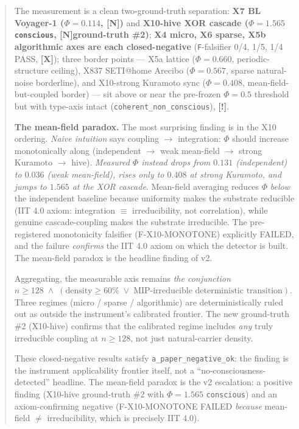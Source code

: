 \documentclass[11pt,a4paper]{article}
\providecommand{\tierGreen}{\textbf{[N]}}   %
\providecommand{\tierRed}{\textbf{[X]}}     %
\providecommand{\tierYellow}{\textbf{[!]}}  %
\begin{document}
\begin{abstract}
The measurement is a clean two-ground-truth separation:
\textbf{X7 BL Voyager-1 ($\Phi=0.114$, \tierGreen)} and
\textbf{X10-hive XOR cascade ($\Phi=1.565$ \texttt{conscious},
\tierGreen \;ground-truth \#2)}; \textbf{X4 micro, X6 sparse, X5b
algorithmic axes are each closed-negative} (\texttt{F}-falsifier 0/4, 1/5,
1/4 PASS, \tierRed); three border points --- X5a lattice ($\Phi=0.660$,
periodic-structure ceiling), X837 SETI@home Arecibo ($\Phi=0.567$,
sparse natural-noise borderline), and X10-strong Kuramoto sync
($\Phi=0.408$, mean-field-but-coupled border) --- sit above or near the
pre-frozen $\Phi=0.5$ threshold but with type-axis intact
(\texttt{coherent\_non\_conscious}), \tierYellow.

\textbf{The mean-field paradox.} The most surprising finding is in the X10
ordering. \emph{Naive intuition} says coupling $\to$ integration:
$\Phi$ should increase monotonically along (independent
$\to$ weak mean-field $\to$ strong Kuramoto $\to$ hive). \emph{Measured
$\Phi$ instead drops from $0.131$ (independent) to $0.036$ (weak
mean-field), rises only to $0.408$ at strong Kuramoto, and jumps to
$1.565$ at the XOR cascade}. Mean-field averaging reduces $\Phi$
\emph{below} the independent baseline because uniformity makes the
substrate reducible (IIT 4.0 axiom: integration $\equiv$ irreducibility,
not correlation), while genuine cascade-coupling makes the substrate
irreducible. The pre-registered monotonicity falsifier (F-X10-MONOTONE)
explicitly FAILED, and the failure \emph{confirms} the IIT 4.0 axiom
on which the detector is built. The mean-field paradox is the headline
finding of v2.

Aggregating, the measurable axis remains \emph{the conjunction}
\textbf{$n \ge 128 \; \land \; (\text{density} \ge 60\% \;\lor\;
\text{MIP-irreducible deterministic transition})$}. Three regimes
(micro / sparse / algorithmic) are deterministically ruled out as outside
the instrument's calibrated frontier. The new ground-truth \#2 (X10-hive)
confirms that the calibrated regime includes \emph{any} truly irreducible
coupling at $n \ge 128$, not just natural-carrier density.

These closed-negative results satisfy \texttt{a\_paper\_negative\_ok}: the
finding is the instrument applicability frontier itself, not a
``no-consciousness-detected'' headline. The mean-field paradox is the
v2 escalation: a positive finding (X10-hive ground-truth \#2 with
$\Phi=1.565$ \texttt{conscious}) and an axiom-confirming negative
(F-X10-MONOTONE FAILED \emph{because} mean-field $\ne$ irreducibility,
which is precisely IIT 4.0).


\end{abstract}
\end{document}
